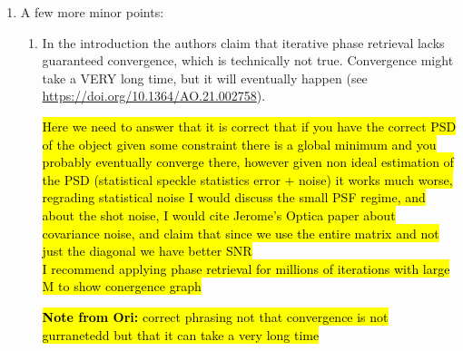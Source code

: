 \documentclass[12pt]{article}
\newcommand{\hlred}[1]{\sethlcolor{red!30}\hl{#1}}
\newcommand{\hlyellow}[1]{\sethlcolor{yellow!50}\hl{#1}}
\newenvironment{reviewercomment}
    {\begin{tcolorbox}[width=\linewidth,colback=gray!5,colframe=commentcolor!50,title=Reviewer Comment,left=5pt,right=5pt]}
    {\end{tcolorbox}}
\newenvironment{ourresponse}
    {\begin{tcolorbox}[width=\linewidth,breakable,enhanced,colback=gray!5,colframe=responsecolor!50,title=Response,left=5pt,right=5pt]}
    {\end{tcolorbox}}
\begin{document}
\begin{enumerate}[label=\arabic*.]
    \item A few more minor points:
    \begin{enumerate}[label=3.\alph*.]
        \item \leavevmode\vspace{-\baselineskip}
        \begin{reviewercomment}
            In the introduction the authors claim that iterative phase retrieval lacks guaranteed convergence, which is technically not true. Convergence might take a VERY long time, but it will eventually happen (see \url{https://doi.org/10.1364/AO.21.002758}).
        \end{reviewercomment}
           \hlred{Here we need to answer that it is correct that if you have the correct PSD of the object given some constraint there is a global minimum and you probably eventually converge there, however given non ideal estimation of the PSD (statistical speckle statistics error + noise) it works much worse, regrading statistical noise I would discuss the small PSF regime, and about the shot noise, I would cite Jerome's Optica paper about covariance noise, and claim that since we use the entire matrix and not just the diagonal we have better SNR}
           \\
           \hlred{I recommend applying phase retrieval for millions of iterations with large M to show conergence graph}
        \begin{ourresponse}
        \hlyellow{
            \textbf{Note from Ori:}
            correct phrasing not that convergence is not gurranetedd but that it can take a very long time}
        \end{ourresponse}
        

\end{enumerate}
\end{enumerate}
\end{document}
